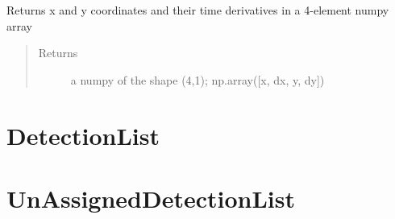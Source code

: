 \documentclass[letterpaper,10pt,english]{sphinxmanual}
\begin{document}
\begin{fulllineitems}
\begin{fulllineitems}
\label{\detokenize{datacontainers:data_containers.TrackPoint.get_array}}
Returns x and y coordinates and their time derivatives in a 4-element numpy array
\begin{quote}\begin{description}
\item[{Returns}] \leavevmode
a numpy of the shape (4,1); np.array({[}x, dx, y, dy{]})

\end{description}\end{quote}

\end{fulllineitems}


\end{fulllineitems}



\section{DetectionList}
\label{\detokenize{datacontainers:detectionlist}}

\begin{fulllineitems}
\label{\detokenize{datacontainers:data_containers.DetectionList}}
\end{fulllineitems}



\section{UnAssignedDetectionList}
\label{\detokenize{datacontainers:unassigneddetectionlist}}
\end{document}
